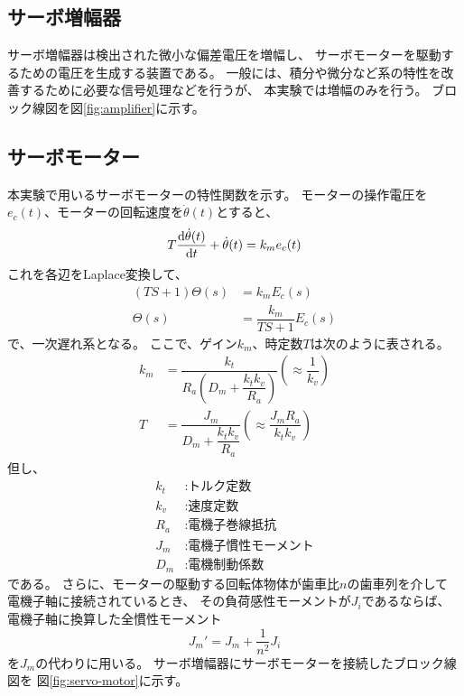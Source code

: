 \documentclass[../../../main]{subfiles}
\begin{document}
\subsection{サーボ増幅器}
サーボ増幅器は検出された微小な偏差電圧を増幅し、
サーボモーターを駆動するための電圧を生成する装置である。
一般には、積分や微分など系の特性を改善するために必要な信号処理などを行うが、
本実験では増幅のみを行う。
ブロック線図を図\ref{fig:amplifier}に示す。


\subsection{サーボモーター}
本実験で用いるサーボモーターの特性関数を示す。
モーターの操作電圧を$e_c(t)$、モーターの回転速度を$\dot{\theta}(t)$とすると、
\begin{equation}
    T \odv{\dot{\theta}(t)}{t} + \dot{\theta}(t) = k_m e_c(t)
\end{equation}
これを各辺をLaplace変換して、
\begin{align}
    \left(TS + 1\right) \Theta(s) & = k_m E_c(s) \nonumber       \\
    \Theta(s)                     & = \dfrac{k_m}{TS + 1} E_c(s)
\end{align}
で、一次遅れ系となる。
ここで、ゲイン$k_m$、時定数$T$は次のように表される。
\begin{align*}
    k_m & = \dfrac{k_t}{R_a \left( D_m + \dfrac{k_t k_v}{R_a} \right)} \left( \approx \dfrac{1}{k_v} \right) \\
    T   & = \dfrac{J_m}{D_m + \dfrac{k_t k_v}{R_a}} \left( \approx \dfrac{J_m R_a}{k_t k_v} \right)
\end{align*}
但し、
\begin{align*}
    k_t & : \text{トルク定数}      \\
    k_v & : \text{速度定数}       \\
    R_a & : \text{電機子巻線抵抗}    \\
    J_m & : \text{電機子慣性モーメント} \\
    D_m & : \text{電機制動係数}
\end{align*}
である。
さらに、モーターの駆動する回転体物体が歯車比$n$の歯車列を介して
電機子軸に接続されているとき、
その負荷感性モーメントが$J_i$であるならば、
電機子軸に換算した全慣性モーメント
\begin{equation}
    J_{m}' = J_m + \dfrac{1}{n^2} J_i
\end{equation}
を$J_m$の代わりに用いる。
サーボ増幅器にサーボモーターを接続したブロック線図を
図\ref{fig:servo-motor}に示す。

\end{document}
